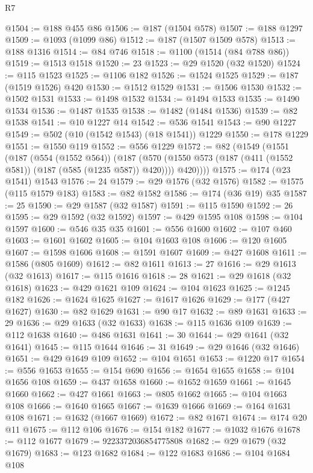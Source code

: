 \begin{lexlean}{R7}
\begin{coremodule}
@1504 := @188 @455 @86
@1506 := @187 (@1504 @578)
@1507 := @188 @1297
@1509 := @1093 (@1099 @86)
@1512 := @187 (@1507 @1509 @578)
@1513 := @188 @1316
@1514 := @84 @746
@1518 := @1100 (@1514 (@84 @788 @86))
@1519 := @1513 @1518
@1520 := 23
@1523 := @29 @1520 (@32 @1520)
@1524 := @115 @1523
@1525 := @1106 @182
@1526 := @1524 @1525
@1529 := @187 (@1519 @1526) @420
@1530 := @1512 @1529
@1531 := @1506 @1530
@1532 := @1502 @1531
@1533 := @1498 @1532
@1534 := @1494 @1533
@1535 := @1490 @1534
@1536 := @1487 @1535
@1538 := @1482 (@1484 @1536)
@1539 := @82 @1538
@1541 := @10 @1227 @14
@1542 := @536 @1541
@1543 := @90 @1227
@1549 := @502 (@10 (@1542 @1543) (@18 @1541)) @1229
@1550 := @178 @1229
@1551 := @1550 @119
@1552 := @556 @1229
@1572 := @82
    (@1549
      (@1551
        (@187
          (@554 (@1552 @564))
          (@187
            (@570 (@1550 @573 (@187 (@411 (@1552 @581)) (@187 (@585 (@1235 @587)) @420))))
            @420))))
@1575 := @174 (@23 @1541) @1543
@1576 := 24
@1579 := @29 @1576 (@32 @1576)
@1582 := @1575 (@115 @1579 @183)
@1583 := @82 @1582
@1586 := @174 (@36 @19) @35
@1587 := 25
@1590 := @29 @1587 (@32 @1587)
@1591 := @115 @1590
@1592 := 26
@1595 := @29 @1592 (@32 @1592)
@1597 := @429 @1595 @108
@1598 := @104 @1597
@1600 := @546 @35 @35
@1601 := @556 @1600
@1602 := @107 @460
@1603 := @1601 @1602
@1605 := @104 @1603 @108
@1606 := @120 @1605
@1607 := @1598 @1606
@1608 := @1591 @1607
@1609 := @427 @1608
@1611 := @1586 (@805 @1609)
@1612 := @82 @1611
@1613 := 27
@1616 := @29 @1613 (@32 @1613)
@1617 := @115 @1616
@1618 := 28
@1621 := @29 @1618 (@32 @1618)
@1623 := @429 @1621 @109
@1624 := @104 @1623
@1625 := @1245 @182
@1626 := @1624 @1625
@1627 := @1617 @1626
@1629 := @177 (@427 @1627)
@1630 := @82 @1629
@1631 := @90 @17
@1632 := @89 @1631
@1633 := 29
@1636 := @29 @1633 (@32 @1633)
@1638 := @115 @1636 @109
@1639 := @112 @1638
@1640 := @486 @1631
@1641 := 30
@1644 := @29 @1641 (@32 @1641)
@1645 := @115 @1644
@1646 := 31
@1649 := @29 @1646 (@32 @1646)
@1651 := @429 @1649 @109
@1652 := @104 @1651
@1653 := @1220 @17
@1654 := @556 @1653
@1655 := @154 @690
@1656 := @1654 @1655
@1658 := @104 @1656 @108
@1659 := @437 @1658
@1660 := @1652 @1659
@1661 := @1645 @1660
@1662 := @427 @1661
@1663 := @805 @1662
@1665 := @104 @1663 @108
@1666 := @1640 @1665
@1667 := @1639 @1666
@1669 := @164 @1631 @108
@1671 := @1632 (@1667 @1669)
@1672 := @82 @1671
@1674 := @174 @20 @11
@1675 := @112 @106
@1676 := @154 @182
@1677 := @1032 @1676
@1678 := @112 @1677
@1679 := 9223372036854775808
@1682 := @29 @1679 (@32 @1679)
@1683 := @123 @1682
@1684 := @122 @1683
@1686 := @104 @1684 @108

\end{coremodule}
\end{lexlean}
